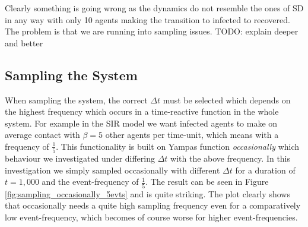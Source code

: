 
Clearly something is going wrong as the dynamics do not resemble the ones of SD in any way with only 10 agents making the transition to infected to recovered. The problem is that we are running into sampling issues. TODO: explain deeper and better

\subsection{Sampling the System}
When sampling the system, the correct $\Delta t$ must be selected which depends on the highest frequency which occurs in a time-reactive function in the whole system. For example in the SIR model we want infected agents to make on average contact with $\beta = 5$ other agents per time-unit, which means with a frequency of $\frac{1}{5}$. This functionality is built on Yampas function \textit{occasionally} which behaviour we investigated under differing $\Delta t$ with the above frequency. In this investigation we simply sampled occasionally with different $\Delta t$ for a duration of $t = 1,000$ and the event-frequency of $\frac{1}{5}$. The result can be seen in Figure \ref{fig:sampling_occasionally_5evts} and is quite striking. The plot clearly shows that occasionally needs a quite high sampling frequency even for a comparatively low event-frequency, which becomes of course worse for higher event-frequencies.

